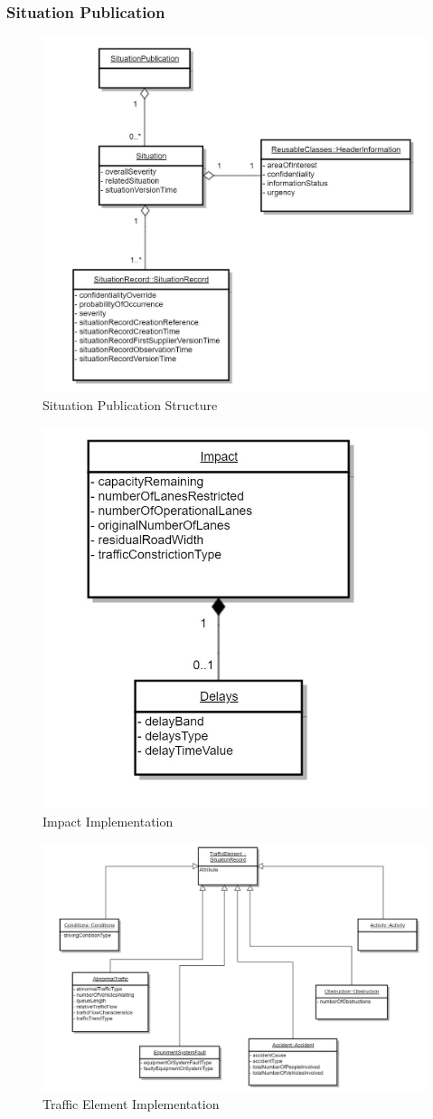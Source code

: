 \subsubsection{Situation Publication}
\begin{figure}
	\begin{center}
		\includegraphics[width=0.7\columnwidth]{images/uml_3_11}
	\end{center}
	\caption{Situation Publication Structure}
	\label{fig:app_uml_3_11}
\end{figure}
\begin{figure}
	\begin{center}
		\includegraphics[width=0.45\columnwidth]{images/uml_4_32}
	\end{center}
	\caption{Impact Implementation}
	\label{fig:app_uml_4_32}
\end{figure}
\begin{figure}
	\begin{center}
		\includegraphics[width=0.85\columnwidth]{images/uml_4_36}
	\end{center}
	\caption{Traffic Element Implementation}
	\label{fig:app_uml_4_36}
\end{figure}
